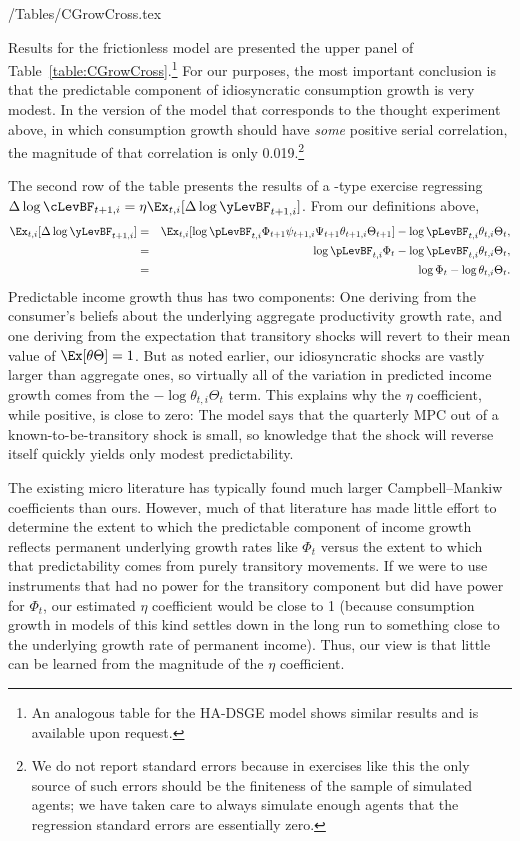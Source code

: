 \documentclass[titlepage]{\econtex}\newcommand{\texname}{cAndCwithStickyE}
\begin{document}
\econtexRoot/Tables/CGrowCross.tex

Results for the frictionless model are presented the upper panel of Table~\ref{table:CGrowCross}.\footnote{An analogous table for the HA-DSGE model shows similar results and is available upon request.}  For our purposes, the most important conclusion is that the predictable component of idiosyncratic consumption growth is very modest.  In the version of the model that corresponds to the thought experiment above, in which consumption growth should have {\it some} positive serial correlation, the magnitude of that correlation is only 0.019.\footnote{We do not report standard errors because in exercises like this the only source of such errors should be the finiteness of the sample of simulated agents; we have taken care to always simulate enough agents that the regression standard errors are essentially zero.}

The second row of the table presents the results of a \cite{cmModel}-type exercise regressing $\Delta \log \cLevBF_{t+1,i} = \eta \Ex_{t,i}[\Delta \log \yLevBF_{t+1,i}]$.  From our definitions above,
\begin{eqnarray*}
  \Ex_{t,i}[\Delta \log \yLevBF_{t+1,i}] & = & \Ex_{t,i}[\log \pLevBF_{t,i}\Phi_{t+1}\psi_{t+1,i}\Psi_{t+1}\theta_{t+1,i}\Theta_{t+1}] - \log \pLevBF_{t,i}\theta_{t,i}\Theta_{t},
  \\ & = & \log \pLevBF_{t,i}\Phi_{t} - \log \pLevBF_{t,i}\theta_{t,i}\Theta_{t},                              
   \\ & = & \log \Phi_{t} - \log \theta_{t,i}\Theta_{t}.
\end{eqnarray*}
Predictable income growth thus has two components: One deriving from the consumer's beliefs about the underlying aggregate productivity growth rate, and one deriving from the expectation that transitory shocks will revert to their mean value of $\Ex[\theta \Theta]=1$.  But as noted earlier, our idiosyncratic shocks are vastly larger than aggregate ones, so virtually all of the variation in predicted income growth comes from the $-\log \theta_{t,i}\Theta_{t}$ term.  This explains why the $\eta$ coefficient, while positive, is close to zero: The model says that the quarterly MPC out of a known-to-be-transitory shock is small, so knowledge that the shock will reverse itself quickly yields only modest predictability.

The existing micro literature has typically found much larger Campbell--Mankiw coefficients than ours.  However, much of that literature has made little effort to determine the extent to which the predictable component of income growth reflects permanent underlying growth rates like $\Phi_{t}$ versus the extent to which that predictability comes from purely transitory movements.  If we were to use instruments that had no power for the transitory component but did have power for $\Phi_{t}$, our estimated $\eta$ coefficient would be close to 1 (because consumption growth in models of this kind settles down in the long run to something close to the underlying growth rate of permanent income).  Thus, our view is that little can be learned from the magnitude of the $\eta$ coefficient.
\end{document}
